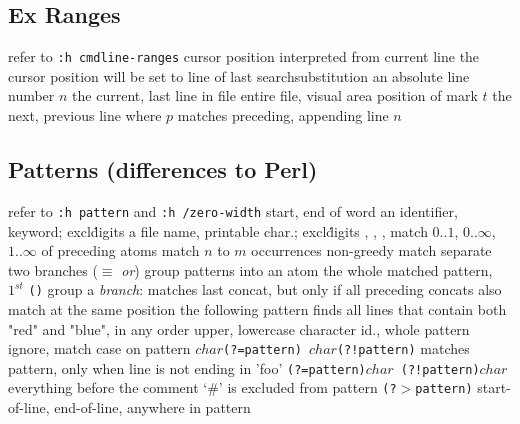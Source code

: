 \subsection{Ex Ranges}	{refer to {\tt :h cmdline-ranges}}
\cmdOper{, }	{cursor position interpreted from current line}
\cmdOper{;\ }	{the cursor position will be set to line of last search\or substitution}
	{an absolute line number $n$}
	{the current, last line in file}
\cmdOper{\% * }	{entire file, visual area}
	{position of mark $t$}
	{the next, previous line where $p$ matches}
	{preceding, appending line $n$}

\subsection{Patterns (differences to Perl)}	{refer to {\tt :h pattern} and {\tt :h /zero-width} }
\cmdOper{\bs$<$ \bs$>$ }	{start, end of word}
	{an identifier, keyword; excl\. digits}
	{a file name, printable char.; excl\. digits}
	{, , \key{\enter}, \key{$\gets$}}
\cmdOper{\bs = * \bs + }	{match $0..1$, $0..\infty$, $1..\infty$ of preceding atoms}
	{match $n$ to $m$ occurrences}
\cmdOper{\bs$\{-\}$ }	{non-greedy match}
\cmdOper{\bs$|$ }	{separate two branches ($\equiv$ {\it or\/})}
\cmdOper{\bs( \bs) }	{group patterns into an atom}
	{the whole matched pattern, $1^{st}$ {\tt()} group}
\cmdOper{\bs \& }	{a {\it branch}: matches last concat, but only if all preceding concats also match at the same position}
	{the following pattern finds all lines that contain both "red" and "blue", in any order}
	{upper, lowercase character}
	{id., whole pattern}
	{ignore, match case on pattern}
	{\tt $char$(?=pattern) $char$(?!pattern)\rm}
	{matches pattern, only when line is not ending in 'foo'}
	{\tt (?=pattern)$char$ (?!pattern)$char$\rm}
	{everything before the
comment `\#' is excluded from pattern}
	{\tt (?$>$pattern)\rm }
\cmdOper{\bs\_\^{} \bs\_\$ }	{start-of-line, end-of-line, anywhere in pattern}

